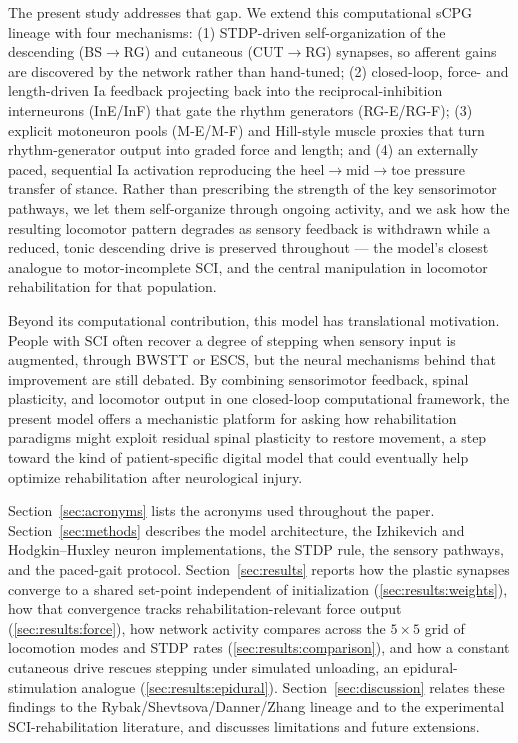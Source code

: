 The present study addresses that gap. We extend this computational sCPG
lineage with four mechanisms: (1) STDP-driven self-organization of the
descending (BS$\to$RG) and cutaneous (CUT$\to$RG) synapses, so afferent
gains are discovered by the network rather than hand-tuned; (2) closed-loop,
force- and length-driven Ia feedback projecting back into the
reciprocal-inhibition interneurons (InE/InF) that gate the rhythm generators
(RG-E/RG-F); (3) explicit motoneuron pools (M-E/M-F) and Hill-style muscle
proxies that turn rhythm-generator output into graded force and length; and
(4) an externally paced, sequential Ia activation reproducing the
heel$\to$mid$\to$toe pressure transfer of stance. Rather than prescribing
the strength of the key sensorimotor pathways, we let them self-organize
through ongoing activity, and we ask how the resulting locomotor pattern
degrades as sensory feedback is withdrawn while a reduced, tonic
descending drive is preserved throughout --- the model's closest analogue
to motor-incomplete SCI, and the central manipulation in locomotor
rehabilitation for that population.

Beyond its computational contribution, this model has translational
motivation. People with SCI often recover a degree of stepping when sensory
input is augmented, through BWSTT or ESCS, but the neural mechanisms behind
that improvement are still debated. By combining sensorimotor feedback,
spinal plasticity, and locomotor output in one closed-loop computational
framework, the present model offers a mechanistic platform for asking how
rehabilitation paradigms might exploit residual spinal plasticity to restore
movement, a step toward the kind of patient-specific digital model that
could eventually help optimize rehabilitation after neurological injury.

Section~\ref{sec:acronyms} lists the acronyms used throughout the paper.
Section~\ref{sec:methods} describes the model architecture, the Izhikevich
and Hodgkin--Huxley neuron implementations, the STDP rule, the sensory
pathways, and the paced-gait protocol. Section~\ref{sec:results} reports how
the plastic synapses converge to a shared set-point independent of
initialization (\autoref{sec:results:weights}), how that convergence tracks
rehabilitation-relevant force output (\autoref{sec:results:force}), how
network activity compares across the $5\times5$ grid of locomotion modes and
STDP rates (\autoref{sec:results:comparison}), and how a constant cutaneous
drive rescues stepping under simulated unloading, an epidural-stimulation
analogue (\autoref{sec:results:epidural}). Section~\ref{sec:discussion}
relates these findings to the Rybak/Shevtsova/Danner/Zhang lineage and to the
experimental SCI-rehabilitation literature, and discusses limitations and
future extensions.
